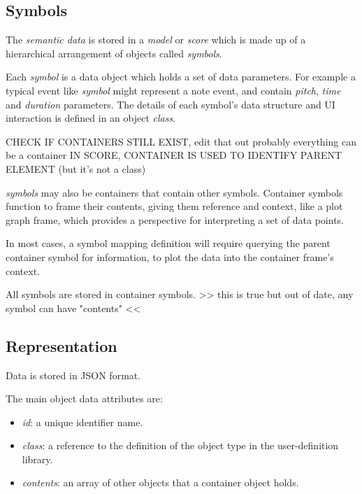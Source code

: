 \documentclass{article}
\begin{document}
\subsection{Symbols}\label{subsec:symbols}

The \textit{semantic data} is stored in a \textit{model} or \textit{score} which is made up of a hierarchical arrangement of objects called \textit{symbols}.

Each \textit{symbol} is a data object which holds a set of data parameters. For example a typical event like \textit{symbol} might represent a note event, and contain \textit{pitch},  \textit{time} and \textit{duration} parameters. The details of each symbol's data structure and UI interaction is defined in an object \textit{class}.

CHECK IF CONTAINERS STILL EXIST, edit that out probably
everything can be a container
IN SCORE, CONTAINER IS USED TO IDENTIFY PARENT ELEMENT (but it's not a class)


\textit{symbols} may also be containers that contain other symbols. Container symbols function to frame their contents, giving them reference and context, like a plot graph frame, which provides a perspective for interpreting a set of data points.

In most cases, a symbol mapping definition will require querying the parent container symbol for information, to plot the data into the container frame's context. 

All symbols are stored in container symbols. 
>> this is true but out of date, any symbol can have "contents" <<

\subsection{Representation}\label{subsec:representation}

Data is stored in JSON format.

The main object data attributes are:
\begin{itemize}\itemsep0pt %
\item \textit{id}: a unique identifier name.
\item \textit{class}: a reference to the definition of the object type in the user-definition library.
\item \textit{contents}: an array of other objects that a container object holds.
\end{itemize}
\end{document}
